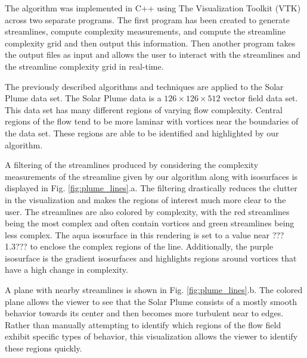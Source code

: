 \documentclass{egpubl}
\begin{document}
The algorithm was implemented in C++ using The Visualization Toolkit (VTK) across two separate programs.
The first program has been created to generate streamlines, compute complexity measurements, and compute the streamline complexity grid and then output this information.
Then another program takes the output files as input and allows the user to interact with the streamlines and the streamline complexity grid in real-time.

The previously described algorithms and techniques are applied to the Solar Plume data set.
The Solar Plume data is a $126 \times 126 \times 512$ vector field data set.
This data set has many different regions of varying flow complexity.
Central regions of the flow tend to be more laminar with vortices near the boundaries of the data set.
These regions are able to be identified and highlighted by our algorithm.

A filtering of the streamlines produced by considering the complexity measurements of the streamline given by our algorithm along with isosurfaces is displayed in Fig. \ref{fig:plume_lines}.a.
The filtering drastically reduces the clutter in the visualization and makes the regions of interest much more clear to the user.
The streamlines are also colored by complexity, with the red streamlines being the most complex and often contain vortices and green streamlines being less complex.
The aqua isosurface in this rendering is set to a value near ???1.3??? to enclose the complex regions of the line.
Additionally, the purple isosurface is the gradient isosurfaces and highlights regions around vortices that have a high change in complexity.

A plane with nearby streamlines is shown in Fig. \ref{fig:plume_lines}.b.
The colored plane allows the viewer to see that the Solar Plume consists of a mostly smooth behavior towards its center and then becomes more turbulent near to edges.
Rather than manually attempting to identify which regions of the flow field exhibit specific types of behavior, this visualization allows the viewer to identify these regions quickly.
\end{document}
